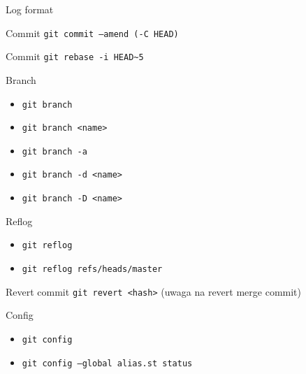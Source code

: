 \documentclass{beamer}
\begin{document}
    \begin{frame}{Log format}

    \end{frame}

    \begin{frame}{Commit}
        \texttt{git commit --amend (-C HEAD)}
    \end{frame}

    \begin{frame}{Commit}
        \texttt{git rebase -i HEAD\textasciitilde5}
    \end{frame}

    \begin{frame}{Branch}
        \begin{itemize}[<+-| alert@+>]
            \item\texttt{git branch}
            \item\texttt{git branch <name>}
            \item\texttt{git branch -a}
            \item\texttt{git branch -d <name>}
            \item\texttt{git branch -D <name>}
        \end{itemize}
    \end{frame}

    \begin{frame}{Reflog}
        \begin{itemize}[<+-| alert@+>]
            \item\texttt{git reflog}
            \item\texttt{git reflog refs/heads/master}
        \end{itemize}
    \end{frame}

    \begin{frame}{Revert commit}
        \texttt{git revert <hash>} (uwaga na revert merge commit)
    \end{frame}

    \begin{frame}{Config}
        \begin{itemize}[<+-| alert@+>]
            \item\texttt{git config}
            \item\texttt{git config --global alias.st status}
        \end{itemize}
    \end{frame}
\end{document}
